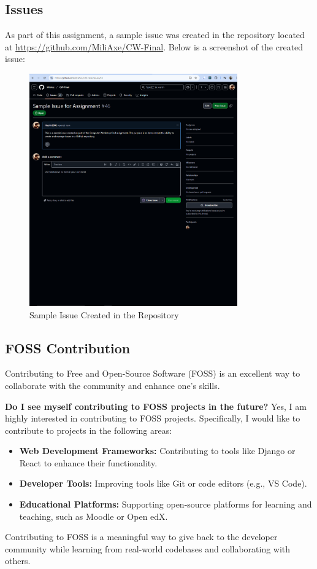 \documentclass{article}
\begin{document}
\subsection{Issues}
As part of this assignment, a sample issue was created in the repository located at \url{https://github.com/MiliAxe/CW-Final}. Below is a screenshot of the created issue:

\begin{figure}[h!]
 \centering
 \includegraphics[width=0.8\textwidth]{issue_screenshot.png}
 \caption{Sample Issue Created in the Repository}
 \label{fig:issue}
\end{figure}

\subsection{FOSS Contribution}
Contributing to Free and Open-Source Software (FOSS) is an excellent way to collaborate with the community and enhance one's skills. 

\textbf{Do I see myself contributing to FOSS projects in the future?}  
Yes, I am highly interested in contributing to FOSS projects. Specifically, I would like to contribute to projects in the following areas:
\begin{itemize}
 \item \textbf{Web Development Frameworks:} Contributing to tools like Django or React to enhance their functionality.
 \item \textbf{Developer Tools:} Improving tools like Git or code editors (e.g., VS Code).
 \item \textbf{Educational Platforms:} Supporting open-source platforms for learning and teaching, such as Moodle or Open edX.
\end{itemize}

Contributing to FOSS is a meaningful way to give back to the developer community while learning from real-world codebases and collaborating with others.
\end{document}
